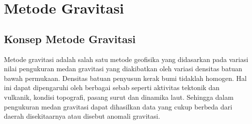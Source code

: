 \section{Metode Gravitasi}
\subsection{Konsep Metode Gravitasi}
\hspace{25pt}Metode gravitasi adalah salah satu metode geofisika yang didasarkan pada variasi nilai pengukuran medan gravitasi yang diakibatkan oleh variasi densitas batuan bawah permukaan. Densitas batuan penyusun kerak bumi tidaklah homogen. Hal ini dapat dipengaruhi oleh berbagai sebab seperti aktivitas tektonik dan vulkanik, kondisi topografi, pasang surut dan dinamika laut. Sehingga dalam pengukuran medan gravitasi dapat dihasilkan data yang cukup berbeda dari daerah disekitaarnya atau disebut anomali gravitasi\citep{Mickus}. 

